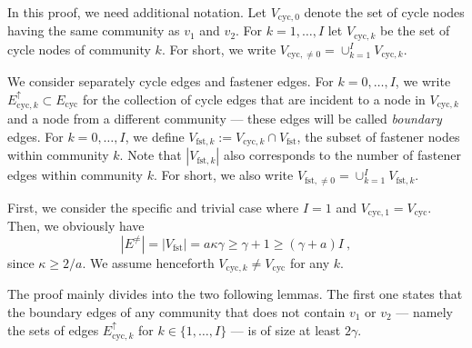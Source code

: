 \documentclass[final]{colt2026}
\newcommand{\1}{\mathbf{1}}
\begin{document}
In this proof, we need additional notation. Let $V_{\mathrm{cyc},0}$ denote the set of cycle nodes  having the same community as $v_1$ and $v_2$. For $k=1,\dots,I$ let $V_{\mathrm{cyc},k}$ be the set of cycle nodes of community $k$. For short, we write 
$V_{\mathrm{cyc},\neq 0}=\cup_{k=1}^IV_{\mathrm{cyc},k}$. 

We consider separately cycle edges and fastener edges. For $k=0,\ldots, I$, we write $E^{\uparrow}_{\mathrm{cyc},k}\subset E_{\mathrm{cyc}}$ for the collection of cycle edges that are incident to a node in $V_{\mathrm{cyc},k}$ and a node from a different community --- these edges will be called \textit{boundary} edges. For $k=0,\ldots, I$, we define $V_{\mathrm{fst},k} := V_{\mathrm{cyc},k} \cap V_{\mathrm{fst}}$, the subset of fastener nodes within community $k$. Note that $|V_{\mathrm{fst},k}|$ also corresponds to the number of fastener edges within community $k$. For short, we also write $V_{\mathrm{fst},\neq 0}=\cup_{k=1}^I V_{\mathrm{fst},k}$. 



\bigskip 



First, we consider the specific  and trivial case where $I=1$ and $V_{\mathrm{cyc},1}=V_{\mathrm{cyc}}$. Then, we obviously have 
\[
|E^{\neq}|= |V_{\mathrm{fst}}|=a\kappa\gamma \geq \gamma+1 \geq (\gamma+a)I\ , 
\] 
since $\kappa\geq 2/a$.  We assume henceforth $V_{\mathrm{cyc},k}\neq V_{\mathrm{cyc}}$ for any $k$.


The proof mainly divides into the two following lemmas. The first one states that the boundary edges of any community that does not contain $v_1$ or $v_2$ --- namely the sets of edges $E_{\mathrm{cyc},k}^{\uparrow}$ for $k \in \{1, \ldots, I\}$ --- is of size at least $2\gamma$. 
\end{document}
